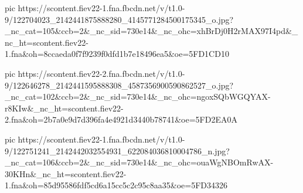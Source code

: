 pic https://scontent.fiev22-1.fna.fbcdn.net/v/t1.0-9/122704023_2142441875888280_4145771284500175345_o.jpg?_nc_cat=105&ccb=2&_nc_sid=730e14&_nc_ohc=xhBrDj0H2rMAX97I4pd&_nc_ht=scontent.fiev22-1.fna&oh=8ccaeda0f7f9239f0dfd1b7e18496ea5&oe=5FD1CD10

pic https://scontent.fiev22-2.fna.fbcdn.net/v/t1.0-9/122646278_2142441595888308_4587356900590862527_o.jpg?_nc_cat=102&ccb=2&_nc_sid=730e14&_nc_ohc=ngoxSQbWGQYAX-r8KIw&_nc_ht=scontent.fiev22-2.fna&oh=2b7a0e9d7d396fa4e4921d3440b78741&oe=5FD2EA0A

pic https://scontent.fiev22-1.fna.fbcdn.net/v/t1.0-9/122751241_2142442032554931_622084036810004786_n.jpg?_nc_cat=106&ccb=2&_nc_sid=730e14&_nc_ohc=ouaWgNBOmRwAX-30KHn&_nc_ht=scontent.fiev22-1.fna&oh=85d95586fdf5cd6a15cc5c2c95c8aa35&oe=5FD34326

\fi
